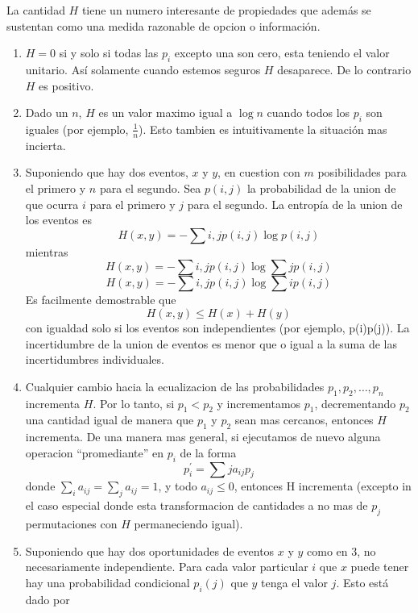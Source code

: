 La cantidad $H$ tiene un numero interesante de propiedades que
adem\'{a}s se sustentan como una medida razonable de opcion o informaci\'{o}n.
\begin{enumerate}
\item $H = 0$ si y solo si todas las $p_{i}$ excepto una son cero, esta teniendo el valor unitario. As\'{i} solamente cuando estemos seguros $H$ desaparece. De lo contrario $H$ es positivo.
\item Dado un $n$, $H$ es un valor maximo igual a $\log n$ cuando todos los $p_{i}$ son iguales (por ejemplo, $\frac{1}{n}$). Esto tambien es intuitivamente la situaci\'{o}n mas incierta.
\item Suponiendo que hay dos eventos, $x$ y $y$, en cuestion con $m$ posibilidades para el primero y $n$ para el segundo. Sea $p(i,j)$ la probabilidad de la union de que ocurra $i$ para el primero y $j$ para el segundo. La entrop\'{i}a de la union de los eventos es
\begin{equation}
H(x,y) = -\sum{i,j}{}p(i,j)\log p(i,j)
\end{equation}
mientras
\begin{equation}
H(x,y) = -\sum{i,j}{}p(i,j)\log\sum{j}{}p(i,j)
\end{equation}
\begin{equation}
H(x,y) = -\sum{i,j}{}p(i,j)\log\sum{i}{}p(i,j)
\end{equation}
Es facilmente demostrable que
\begin{equation}
H(x,y) \leq H(x) + H(y)
\end{equation}
con igualdad solo si los eventos son independientes (por ejemplo, p(i)p(j)). La incertidumbre de la union de eventos es menor que o igual a la suma de las incertidumbres individuales.
\item Cualquier cambio hacia la ecualizacion de las probabilidades  $p_{1}, p_{2}, \ldots, p_{n}$ incrementa $H$. Por lo tanto, si $p_{1} < p_{2}$ y incrementamos $p_{1}$, decrementando $p_{2}$ una cantidad igual de manera que $p_{1}$ y $p_{2}$ sean mas cercanos, entonces $H$ incrementa. De una manera mas general, si ejecutamos de nuevo alguna operacion ``promediante'' en $p_{i}$ de la forma
\begin{equation}
p^{'}_{i} = \sum{j}{} a_{ij}p_{j}
\end{equation}
donde $\sum_{i} a_{ij} = \sum_{j} a_{ij} = 1$, y todo $a_{ij} \leq 0$, entonces H incrementa (excepto in el caso especial donde esta transformacion de cantidades a no mas de $p_{j}$ permutaciones con $H$ permaneciendo igual).
\item Suponiendo que hay dos oportunidades de eventos $x$ y $y$ como en 3, no necesariamente independiente. Para cada valor particular $i$ que $x$ puede tener hay una probabilidad condicional $p_{i}(j)$ que $y$ tenga el valor $j$. Esto est\'{a} dado por

\end{enumerate}
